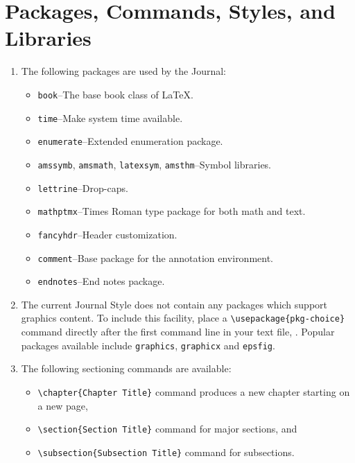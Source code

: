 \section{Packages, Commands, Styles, and Libraries}

\begin{enumerate}

 \item The following packages are used by the Journal:
       \begin{itemize}
        \item \texttt{book}--The base book class of \LaTeX.
        \item \texttt{time}--Make system time available.
        \item \texttt{enumerate}--Extended enumeration package.
        \item \texttt{amssymb}, \texttt{amsmath}, \texttt{latexsym}, \texttt{amsthm}--Symbol libraries.
        \item \texttt{lettrine}--Drop-caps.
        \item \texttt{mathptmx}--Times Roman type package for both math and text.
        \item \texttt{fancyhdr}--Header customization.
        \item \texttt{comment}--Base package for the annotation environment.
        \item \texttt{endnotes}--End notes package.
       \end{itemize}


 \item The current Journal Style does not contain any packages which support graphics content.
       To include this facility, place a \verb|\usepackage{pkg-choice}| command  directly after
       the first command line in your text file, \verb||.  Popular packages available
       include \texttt{graphics}, \texttt{graphicx} and \texttt{epsfig}.


 \item The following sectioning commands are available:
       \begin{itemize}
        \item \verb"\chapter{Chapter Title}" command produces a new chapter starting on a new page,
        \item \verb"\section{Section Title}" command for major sections, and
        \item \verb"\subsection{Subsection Title}" command for subsections.
       \end{itemize}


\end{enumerate}
